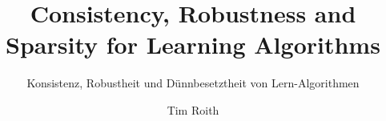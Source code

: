 \usepackage[T1]{fontenc}
\usepackage{lmodern}
\title{Consistency, Robustness and Sparsity for Learning Algorithms}
\subtitle{Konsistenz, Robustheit und Dünnbesetztheit von Lern-Algorithmen}
\author{Tim Roith}
\thesistype{}
\setpdfinfo %

\usepackage[NatClassic]{styles/fau-colors}

\usepackage[thmboxing=styleC,
			boxingstyle=styleC,
			chapterheader=styleC, 
			footerheader=styleA,
			]{styles/fau-appearence}
\usepackage{styles/fau-symbols}
%
\usepackage{kantlipsum}
\usepackage[totoc]{idxlayout}
\usepackage[final]{pdfpages}
\usetikzlibrary{positioning}
\usetikzlibrary{shapes.multipart}
\usepackage{wrapfig}

